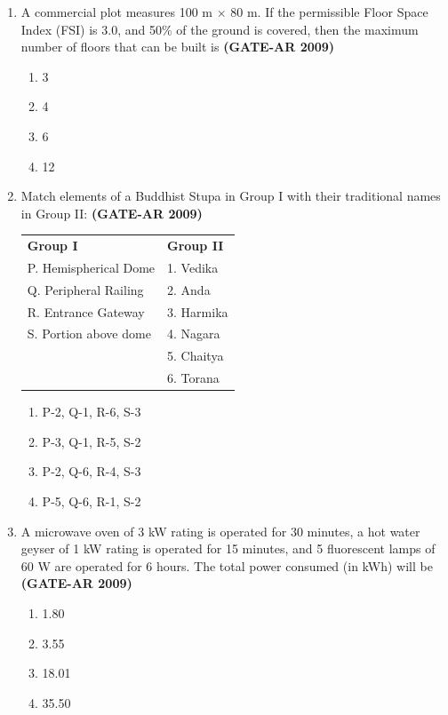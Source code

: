 \documentclass[a4paper,10pt]{article}
\begin{document}
\begin{enumerate}
    \item A commercial plot measures 100 m $\times$ 80 m. If the permissible Floor Space Index (FSI) is 3.0, and 50\% of the ground is covered, then the maximum number of floors that can be built is \hfill \textbf{(GATE-AR 2009)}
    \begin{multicols}{4}
	\begin{enumerate}
        \item 3
        \item 4
        \item 6
        \item 12
    \end{enumerate}
	\end{multicols}

    \item Match elements of a Buddhist Stupa in Group I with their traditional names in Group II: \hfill \textbf{(GATE-AR 2009)} \\
	\begin{tabular}{ l l }
	\textbf{Group I} & \textbf{Group II} \\
	P. Hemispherical Dome & 1. Vedika \\
	Q. Peripheral Railing & 2. Anda \\
	R. Entrance Gateway & 3. Harmika \\
	S. Portion above dome & 4. Nagara \\
	& 5. Chaitya \\
	& 6. Torana \\
	\end{tabular}
	\begin{multicols}{2}
	\begin{enumerate}
        \item P-2, Q-1, R-6, S-3
        \item P-3, Q-1, R-5, S-2
        \item P-2, Q-6, R-4, S-3
        \item P-5, Q-6, R-1, S-2
    \end{enumerate}
	\end{multicols}

    \item A microwave oven of 3 kW rating is operated for 30 minutes, a hot water geyser of 1 kW rating is operated for 15 minutes, and 5 fluorescent lamps of 60 W are operated for 6 hours. The total power consumed (in kWh) will be \hfill \textbf{(GATE-AR 2009)}
    \begin{multicols}{4}
	\begin{enumerate}
        \item 1.80
        \item 3.55
        \item 18.01
        \item 35.50
    \end{enumerate}
	\end{multicols}


\end{enumerate}
\end{document}
